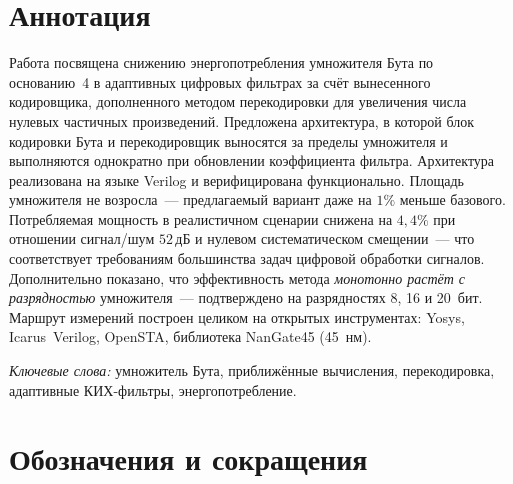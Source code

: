 \documentclass[a4paper, 12pt, oneside]{report}
\begin{document}
\chapter*{Аннотация}

Работа посвящена снижению энергопотребления умножителя Бута по основанию~4 в
адаптивных цифровых фильтрах за счёт вынесенного кодировщика,
дополненного методом перекодировки для увеличения числа нулевых частичных 
произведений.
Предложена архитектура, в которой блок кодировки Бута и перекодировщик
выносятся за пределы умножителя и выполняются однократно при обновлении
коэффициента фильтра. Архитектура реализована на языке Verilog и
верифицирована функционально. Площадь умножителя не возросла~---
предлагаемый вариант даже на $1\%$ меньше базового. Потребляемая мощность
в реалистичном сценарии снижена на $4{,}4\%$ при отношении сигнал/шум
$52\,\text{дБ}$ и нулевом систематическом смещении~--- что соответствует
требованиям большинства задач цифровой обработки сигналов.
Дополнительно показано, что эффективность метода \textit{монотонно
растёт с разрядностью} умножителя~--- подтверждено на разрядностях
8, 16 и 20~бит. Маршрут измерений
построен целиком на открытых инструментах: Yosys, Icarus~Verilog,
OpenSTA, библиотека NanGate45 (45~нм).

\vspace{0.5em}
\textit{Ключевые слова:} умножитель Бута, приближённые вычисления,
перекодировка, адаптивные КИХ-фильтры, энергопотребление.

\tableofcontents

\chapter*{Обозначения и сокращения}
\end{document}
